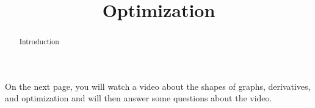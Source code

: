 \documentclass[handout]{ximera}
\title{Optimization}
\begin{document}
\begin{abstract} Introduction %
\end{abstract}

\maketitle

On the next page, you will watch a video about the shapes of graphs, derivatives, and optimization and will then answer some questions about the video.

\end{document}
